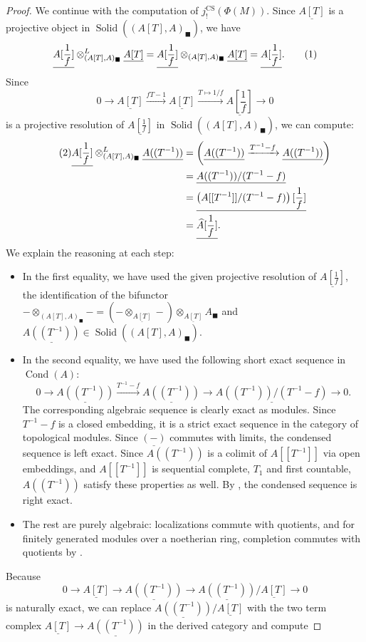 \documentclass[11pt]{amsart}
\newcommand\numberthis{\addtocounter{equation}{1}\tag{\theequation}}
\newcommand{\ra}{\rightarrow} %
\newcommand{\xra}{\xrightarrow}
\newcommand{\bbox}{{\blacksquare}}
\newcommand{\CS}{\operatorname{CS}}
\newcommand{\Cond}{\operatorname{Cond}}
\newcommand{\Solid}{\operatorname{Solid}}
\renewcommand{\hat}{\widehat} %
\newcommand{\ul}{\underline}
\theoremstyle{plain}
\theoremstyle{definition}
\numberwithin{equation}{prop}
\begin{document}
\begin{proof}
We continue with the computation of $j_!^{\CS}(\Phi(M))$.
Since $\ul{A[T]}$ is a projective object in $\Solid((A[T],A)_\bbox)$, we have
\[\ul{A[\frac{1}{f}]}\otimes^L_{(A[T],A)_\bbox} \ul{A[T]}
=\ul{A[\frac{1}{f}]}\otimes_{(A[T],A)_\bbox} \ul{A[T]}
=\ul{A[\frac{1}{f}]}.
\numberthis \label{thmeqCS1}\]
Since 
$$0\ra \ul{A[T]}\xra{fT-1} \ul{A[T]}\xra{T\mapsto 1/f} \ul{A[\frac{1}{f}]}\ra 0$$
is a projective resolution of $\ul{A[\frac{1}{f}]}$ in $\Solid((A[T],A)_\bbox)$,
we can compute:
\begin{align*} 
\numberthis \label{thmeqCS2}
\ul{A[\frac{1}{f}]}\otimes^L_{(A[T],A)_\bbox} \ul{A((T^{-1}))}
&=\left(\ul{A((T^{-1}))}
\xra{T^{-1}-f}   \ul{A((T^{-1}))}\right)
\\&
=\ul{A((T^{-1}))/(T^{-1}-f)}
\\&
=\ul{\left(A[[T^{-1}]]/(T^{-1}-f)\right)[\frac{1}{f}]}
\\&
=\ul{\hat A[\frac{1}{f}]}.
\end{align*}
We explain the reasoning at each step:
\begin{itemize}
\item 
In the first equality, we have used the given projective resolution of $\ul{A[\frac{1}{f}]}$, the identification of the bifunctor $-\otimes_{(A[T],A)_\bbox}-=(-\otimes_{\ul{A[T]}}-)\otimes_{\ul{A[T]}}A_\bbox$ and
$\ul{A((T^{-1}))}\in \Solid((A[T],A)_\bbox)$. 
\item 
In the second equality, we have used the following short exact sequence in $\Cond(A)$:
$$0\ra \ul{A((T^{-1}))}\xra{T^{-1}-f}\ul{A((T^{-1}))}\ra \ul{A((T^{-1}))/(T^{-1}-f)} \ra 0.$$
The corresponding algebraic sequence is clearly exact as modules. 
Since $T^{-1}-f$ is a closed embedding, it is a strict exact sequence in the category of topological modules.
Since $\ul{(-)}$ commutes with limits, the condensed sequence is left exact. 
Since $A((T^{-1}))$ is a  colimit of $A[[T^{-1}]]$ via open embeddings, and $A[[T^{-1}]]$ is sequential complete, $T_1$ and first countable, $A((T^{-1}))$ satisfy these properties as well. 
By , the condensed sequence is right exact.
\item 
The rest are purely algebraic: localizations commute with quotients, and for finitely generated modules over a noetherian ring, completion commutes with quotients by \cite[Theorem 8.1(ii)]{Matsumura}.
\end{itemize}
Because 
$$0\ra \ul{A[T]}\ra \ul{A((T^{-1}))}\ra \ul{A((T^{-1}))}/\ul{A[T]}\ra 0 $$
is naturally exact, we can replace $\ul{A((T^{-1}))}/\ul{A[T]}$ with the two term complex $\ul{A[T]}\ra \ul{A((T^{-1}))}$ in the derived category and compute

\end{proof}
\end{document}
